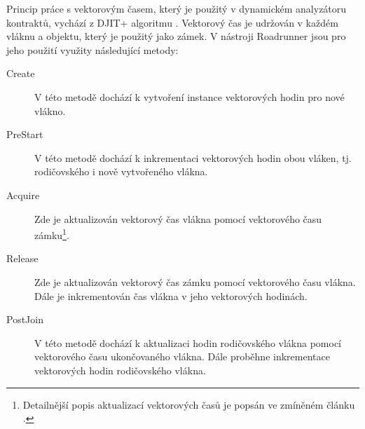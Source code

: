 Princip práce s vektorovým časem, který je použitý v dynamickém analyzátoru kontraktů, vychází z DJIT+ algoritmu \cite{cite:VC-anaconda}. Vektorový čas je udržován v každém vláknu a objektu, který je použitý jako zámek. V nástroji Roadrunner jsou pro jeho použití využity následující metody:

\begin{description}
\item[Create] V této metodě dochází k vytvoření instance vektorových hodin pro nové vlákno.
\item[PreStart] V této metodě dochází k inkrementaci vektorových hodin obou vláken, tj. rodičovského i nově vytvořeného vlákna.
\item[Acquire] Zde je aktualizován vektorový čas vlákna pomocí vektorového času zámku\footnote{Detailnější popis aktualizací vektorových časů je popsán ve zmíněném článku \cite{cite:VC-anakonda}.}.
\item[Release] Zde je aktualizován vektorový čas zámku pomocí vektorového času vlákna. Dále je inkrementován čas vlákna v jeho vektorových hodinách.
\item[PostJoin] V této metodě dochází k aktualizaci hodin rodičovského vlákna pomocí vektorového času ukončovaného vlákna. Dále proběhne inkrementace vektorových hodin rodičovského vlákna.
\end{description}







